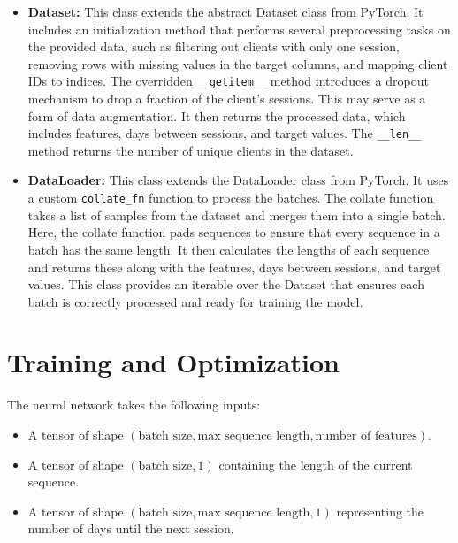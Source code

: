 \begin{itemize}
	\item \textbf{Dataset:} This class extends the abstract Dataset class from PyTorch.
	      It includes an initialization method that performs several preprocessing
	      tasks on the provided data, such as filtering out clients with only one
	      session, removing rows with missing values in the target columns, and
	      mapping client IDs to indices. The overridden \texttt{\_\_getitem\_\_} method
	      introduces a dropout mechanism to drop a fraction of the client's sessions.
	      This may serve as a form of data augmentation. It then returns the processed
	      data, which includes features, days between sessions, and target values.
	      The \texttt{\_\_len\_\_} method returns the number of unique clients in the dataset.

	\item \textbf{DataLoader:} This class extends the DataLoader class from PyTorch.
	      It uses a custom \texttt{collate\_fn} function to process the batches.
	      The collate function takes a list of samples from the dataset and merges
	      them into a single batch. Here, the collate function pads sequences to
	      ensure that every sequence in a batch has the same length. It then calculates
	      the lengths of each sequence and returns these along with the features,
	      days between sessions, and target values. This class provides an iterable
	      over the Dataset that ensures each batch is correctly processed and ready
	      for training the model.
\end{itemize}

\section{Training and Optimization}

The neural network takes the following inputs:

\begin{itemize}
	\item A tensor of shape $(\text{batch size}, \text{max sequence length}, \text{number
			      of features})$.
	\item A tensor of shape $(\text{batch size}, 1)$ containing the length of the current
	      sequence.
	\item A tensor of shape $(\text{batch size}, \text{max sequence length}, 1)$
	      representing the number of days until the next session.
\end{itemize}

